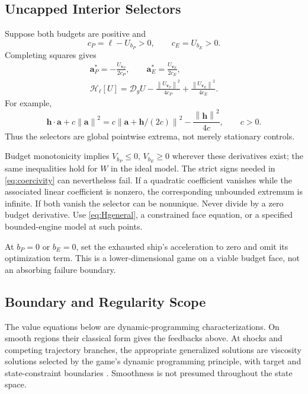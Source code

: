 \documentclass[journal,a4paper]{IEEEtran}
\newcommand{\D}{\mathcal D}
\newcommand{\HH}{\mathcal H}
\newcommand{\norm}[1]{\left\|#1\right\|}
\begin{document}
\subsection{Uncapped Interior Selectors}
Suppose both budgets are positive and
\begin{equation}
 c_P=\ell-U_{b_P}>0,\qquad c_E=U_{b_E}>0.
 \label{eq:coercivity}
\end{equation}
Completing squares gives
\begin{align}
 \boxed{\mathbf a_P^*=-\frac{U_{\mathbf v_P}}{2c_P},\qquad
        \mathbf a_E^*= \frac{U_{\mathbf v_E}}{2c_E},}
 \label{eq:feedbackfull}\\
 \boxed{\HH_\ell[U]=\D_g U
       -\frac{\norm{U_{\mathbf v_P}}^2}{4c_P}
       +\frac{\norm{U_{\mathbf v_E}}^2}{4c_E}.}
 \label{eq:Hquadratic}
\end{align}
For example,
\begin{equation}
 \mathbf h\cdot\mathbf a+c\norm{\mathbf a}^2
 =c\norm{\mathbf a+\mathbf h/(2c)}^2
  -\frac{\norm{\mathbf h}^2}{4c},\qquad c>0.
\end{equation}
Thus the selectors are global pointwise extrema, not merely stationary controls.

Budget monotonicity implies $V_{b_P}\le0$, $V_{b_E}\ge0$ wherever these derivatives exist; the same inequalities hold for $W$ in the ideal model. The strict signs needed in \eqref{eq:coercivity} can nevertheless fail. If a quadratic coefficient vanishes while the associated linear coefficient is nonzero, the corresponding unbounded extremum is infinite. If both vanish the selector can be nonunique. Never divide by a zero budget derivative. Use \eqref{eq:Hgeneral}, a constrained face equation, or a specified bounded-engine model at such points.

At $b_P=0$ or $b_E=0$, set the exhausted ship's acceleration to zero and omit its optimization term. This is a lower-dimensional game on a viable budget face, not an absorbing failure boundary.

\subsection{Boundary and Regularity Scope}
The value equations below are dynamic-programming characterizations. On smooth regions their classical form gives the feedbacks above. At shocks and competing trajectory branches, the appropriate generalized solutions are viscosity solutions selected by the game's dynamic programming principle, with target and state-constraint boundaries \cite{Soravia1993}. Smoothness is not presumed throughout the state space.
\end{document}
